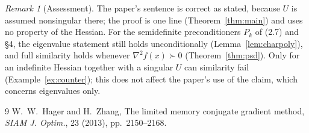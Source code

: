 \documentclass[11pt]{article}
\theoremstyle{remark}
\newtheorem{remark}{Remark}
\theoremstyle{definition}
\begin{document}
\begin{remark}[Assessment]
The paper's sentence is correct as stated, because $U$ is assumed nonsingular
there; the proof is one line (Theorem~\ref{thm:main}) and uses no property of
the Hessian. For the semidefinite preconditioners $P_k$ of (2.7) and \S4, the
eigenvalue statement still holds unconditionally (Lemma~\ref{lem:charpoly}),
and full similarity holds whenever $\nabla^2f(x)\succ0$ (Theorem~\ref{thm:psd}).
Only for an indefinite Hessian together with a singular $U$ can similarity fail
(Example~\ref{ex:counter}); this does not affect the paper's use of the claim,
which concerns eigenvalues only.
\end{remark}

\begin{thebibliography}{9}
 W.~W.~Hager and H.~Zhang, The limited memory conjugate gradient
method, \emph{SIAM J. Optim.}, 23 (2013), pp.~2150--2168.
\end{thebibliography}
\end{document}

